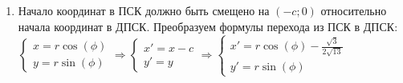 \begin{enumerate}
	\item Начало координат в ПСК должно быть смещено на $(-c; 0)$ относительно начала координат в ДПСК. Преобразуем формулы перехода из ПСК в ДПСК: $\begin{cases} x = r\cos(\phi)\\ y = r\sin(\phi) \end{cases} \Rightarrow \begin{cases} x' =  x - c \\ y' = y\end{cases} \Rightarrow \begin{cases} x' = r\cos(\phi) - \frac{\sqrt{3}}{2\sqrt{13}}\\ y'  = r\sin(\phi) \end{cases}$ 

\end{enumerate}

\clearpage